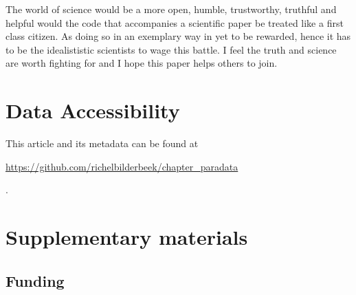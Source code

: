 
The world of science would be a more open, humble, trustworthy, truthful
and helpful would the code that accompanies a scientific paper
be treated like a first class citizen. As doing so in an exemplary way
in yet to be rewarded, hence it has to be the idealististic scientists
to wage this battle. I feel the truth and science are worth fighting for
and I hope this paper helps others to join.

\section{Data Accessibility}

This article and its metadata can be found at 
\begin{sloppypar}\url{https://github.com/richelbilderbeek/chapter_paradata}\end{sloppypar}.




\newpage
\appendix
\section{Supplementary materials}

\renewcommand{\thefigure}{S\arabic{figure}}
\setcounter{figure}{0}

\renewcommand{\thetable}{S\arabic{table}}
\setcounter{table}{0}

\subsection{Funding}


